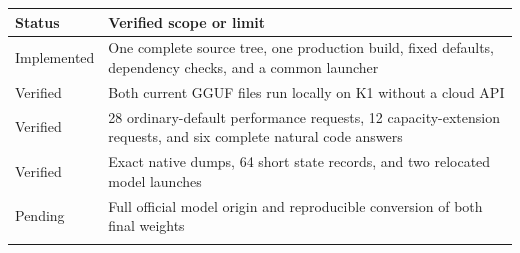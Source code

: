 \documentclass[10pt,a4paper]{article}
\begin{document}
\begin{longtable}[]{@{}ll@{}}
\toprule
\begin{minipage}[b]{0.47\columnwidth}\raggedright
Status\strut
\end{minipage} & \begin{minipage}[b]{0.47\columnwidth}\raggedright
Verified scope or limit\strut
\end{minipage}\tabularnewline
\midrule
\endhead
\begin{minipage}[t]{0.47\columnwidth}\raggedright
Implemented\strut
\end{minipage} & \begin{minipage}[t]{0.47\columnwidth}\raggedright
One complete source tree, one production build, fixed defaults,
dependency checks, and a common launcher\strut
\end{minipage}\tabularnewline
\begin{minipage}[t]{0.47\columnwidth}\raggedright
Verified\strut
\end{minipage} & \begin{minipage}[t]{0.47\columnwidth}\raggedright
Both current GGUF files run locally on K1 without a cloud API\strut
\end{minipage}\tabularnewline
\begin{minipage}[t]{0.47\columnwidth}\raggedright
Verified\strut
\end{minipage} & \begin{minipage}[t]{0.47\columnwidth}\raggedright
28 ordinary-default performance requests, 12 capacity-extension
requests, and six complete natural code answers\strut
\end{minipage}\tabularnewline
\begin{minipage}[t]{0.47\columnwidth}\raggedright
Verified\strut
\end{minipage} & \begin{minipage}[t]{0.47\columnwidth}\raggedright
Exact native dumps, 64 short state records, and two relocated model
launches\strut
\end{minipage}\tabularnewline
\begin{minipage}[t]{0.47\columnwidth}\raggedright
Pending\strut
\end{minipage} & \begin{minipage}[t]{0.47\columnwidth}\raggedright
Full official model origin and reproducible conversion of both final
weights\strut
\end{minipage}\tabularnewline
\begin{minipage}[t]{0.47\columnwidth}\raggedright

\end{minipage}
\end{longtable}
\end{document}
